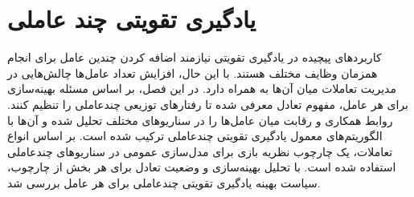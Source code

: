 \chapter{یادگیری تقویتی چند عاملی}
کاربردهای پیچیده در یادگیری تقویتی نیازمند اضافه کردن چندین عامل
 برای انجام همزمان وظایف مختلف هستند. با این حال، افزایش تعداد عامل‌ها چالش‌هایی در مدیریت تعاملات میان آن‌ها به همراه دارد. در این فصل، بر اساس مسئله بهینه‌سازی برای هر عامل، مفهوم تعادل
  معرفی شده تا رفتارهای توزیعی چندعاملی را تنظیم کنند. روابط همکاری و رقابت میان عامل‌ها را در سناریوهای مختلف تحلیل شده و آن‌ها با الگوریتم‌های معمول یادگیری تقویتی چندعاملی ترکیب شده است. بر اساس انواع تعاملات، یک چارچوب نظریه بازی برای مدل‌سازی عمومی در سناریوهای چندعاملی استفاده شده است. با تحلیل بهینه‌سازی و وضعیت تعادل برای هر بخش از چارچوب، سیاست بهینه یادگیری تقویتی چندعاملی برای هر عامل بررسی شد.
  
  
  
    
    
    
    
    